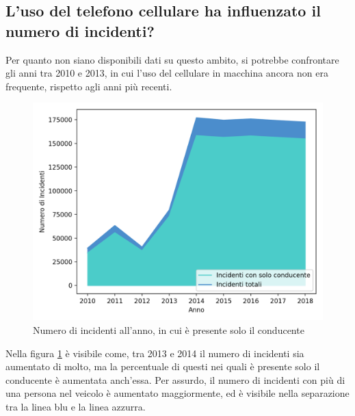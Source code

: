 \documentclass[a4paper]{report}
\begin{document}

\subsection{L'uso del telefono cellulare ha influenzato il numero di incidenti?}

Per quanto non siano disponibili dati su questo ambito, si potrebbe confrontare gli 
anni tra 2010 e 2013, in cui l'uso del cellulare in macchina ancora non era frequente, 
rispetto agli anni più recenti.


\begin{figure}
    \includegraphics[width=\linewidth]{../src/incidenti/incidenti_senza_coords/anno/incremento_incidenti.png}
    \caption{Numero di incidenti all'anno, in cui è presente solo il conducente}
    \label{fig:incremento-incidenti}
\end{figure}

Nella figura \ref{fig:incremento-incidenti} è visibile come, 
tra 2013 e 2014 il numero di incidenti sia aumentato di molto, 
ma la percentuale di questi nei quali è presente solo il conducente è aumentata anch'essa.
Per assurdo, il numero di incidenti con più di una persona nel veicolo è aumentato maggiormente, 
ed è visibile nella separazione tra la linea blu e la linea azzurra.\\
\end{document}
